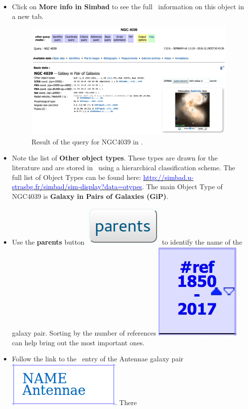 \documentclass [a4paper, 12pt]{article}
\begin{document}
\begin{itemize}
    \item Click on \textbf{More info in Simbad} to see the full \simbad\
information on this object in a new tab.
\begin{figure}[H]
    \center
    \includegraphics[width=1
    \textwidth]{../images/simbad_section_basic-data.jpg}
    \caption{Result of the query for NGC4039 in \simbad.}
    \label{fig:simbad}
\end{figure}
    \item Note the list of \textbf{Other object types}. These types are
drawn for the literature and are stored in \simbad\ using a
hierarchical classification scheme. The full list of Object Types can
be found here:
\hyperref[http://simbad.u-strasbg.fr/simbad/sim-display?data=otypes]
{\textcolor{blue}{http://simbad.u-strasbg.fr/simbad/sim-display?data=otypes}}.
The main Object Type of NGC4039 is \textbf{Galaxy in Pairs of Galaxies
(GiP)}.
    \item Use the {\bf parents} button \includegraphics[width=0.07
\textwidth]{../images/simbad_button_parents.png} to identify the name
of the galaxy pair. Sorting by the number of references
\includegraphics[width=0.04  \textwidth]{../images/simbad_sort_references.jpg}
can help
bring out the most important ones.
    \item Follow the link to the \simbad\ entry of the Antennae galaxy pair
\includegraphics[width=0.07
\textwidth]{../images/simbad_antennae-galaxt-pair_link.png}. There

\end{itemize}
\end{document}
